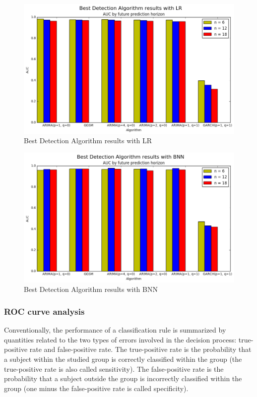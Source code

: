 \documentclass{acm_proc_article-sp}
\begin{document}
\begin{figure}[!h]
\centering
    \includegraphics[scale=0.35]{figures/best_detection_lr.png}
\caption{Best Detection Algorithm results with LR} 
\label{fig:lrtop3}
\end{figure}


\begin{figure}[!h]
\centering
    \includegraphics[scale=0.35]{figures/best_detection_bnn.png}
\caption{Best Detection Algorithm results with BNN} 
\label{fig:bnntop3}
\end{figure}

\subsubsection{ROC curve analysis}

Conventionally, the performance of a classification rule is summarized by quantities related to the two types of errors
involved in the decision process: true-positive rate and false-positive rate. The true-positive rate is the probability that a
subject within the studied group is correctly classified within the group (the true-positive rate is also called sensitivity).
The false-positive rate is the probability that a subject outside the group is incorrectly classified within the group (one minus
the false-positive rate is called specificity).
\end{document}
